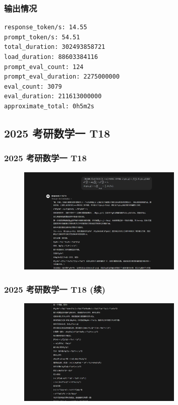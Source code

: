 \begin{frame}[fragile]
    \frametitle{输出情况}
    \begin{lstlisting}[language=text, caption={2024 AIME I Problem 4生成情况}]
response_token/s: 14.55
prompt_token/s: 54.51
total_duration: 302493858721
load_duration: 88603384116
prompt_eval_count: 124
prompt_eval_duration: 2275000000
eval_count: 3079
eval_duration: 211613000000
approximate_total: 0h5m2s
    \end{lstlisting}
\end{frame}

\subsection{2025 考研数学一 T18}

\begin{frame}
    \frametitle{2025 考研数学一 T18}
    \begin{figure}
        \centering
        \includegraphics[width=0.7\textwidth]{./pic/7.png} %
        \label{fig:kaoyan_problem_1}
    \end{figure}
\end{frame}

\begin{frame}
    \frametitle{2025 考研数学一 T18 (续)}
    \begin{figure}
        \centering
        \includegraphics[width=0.7\textwidth]{./pic/8.png} %
        \label{fig:kaoyan_problem_2}
    \end{figure}
\end{frame}

